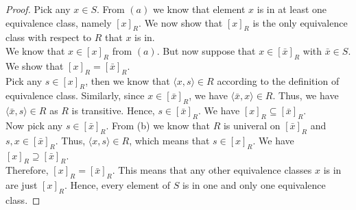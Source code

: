 \documentclass[12pt]{article}
\begin{document}
\begin{proof}
    Pick any $x \in S$. From $(a)$ we know that element $x$ is in at least one equivalence class, 
    namely $[x]_R$. We now show that $[x]_R$ is the only equivalence class with respect to 
    $R$ that $x$ is in.\\
    We know that $x \in [x]_R$ from $(a)$. But now suppose that $x \in [\bar{x}]_R$ with
    $\bar{x} \in S$. We show that $[x]_R = [\bar{x}]_R$.\\
    Pick any $s \in [x]_R$, then we know that $\langle x,s \rangle \in R$ according to the
    definition of equivalence class. Similarly, since $x \in [\bar{x}]_R$, we have 
    $\langle \bar{x}, x \rangle \in R$. Thus, we have $\langle \bar{x}, s \rangle \in R$ 
    as $R$ is transitive.
    Hence, $s \in [\bar{x}]_R$. We have $[x]_R \subseteq [\bar{x}]_R$.\\
    Now pick any $s \in [\bar{x}]_R$. From (b) we know that $R$ is univeral on $[\bar{x}]_R$ and 
    $s, x \in [\bar{x}]_R$. Thus, $\langle x, s \rangle \in R$, which means that 
    $s \in [x]_R$. We have $[x]_R \supseteq [\bar{x}]_R$. \\
    Therefore, $[x]_R = [\bar{x}]_R$. This means that any other equivalence classes $x$ is in
    are just $[x]_R$. Hence, every element of $S$ is in one and only one equivalence class.

\end{proof}
\end{document}
